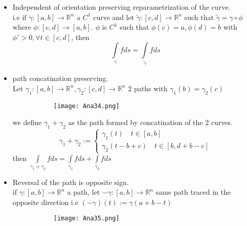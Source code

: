 \documentclass[8pt]{extreport}
\newcommand{\R}{\mathbb{R}}
\begin{document}
\begin{itemize}
\item Independent of orientation preserving reparametrization of the curve.\\
i.e if $\gamma : [a,b] \to \R^n$ a $C^1$ curve and let $\tilde{\gamma} : [c,d] \to \R^n$ such that $\tilde{\gamma} = \gamma \circ \phi$ where $\phi:[c,d] \to [a,b]$. $\phi$ is $C^1$ such that $\phi(c) = a, \phi(d) = b$ with $\phi' > 0, \forall t \in [c,d]$, then 
$$ \int\limits_\gamma fds = \int\limits_{\tilde{\gamma}} fds$$
\item path concatination preserving.\\
Let $\gamma_1 :[a,b] \to \R^n, \gamma_2: [c,d] \to \R^n$ 2 paths with $\gamma_1(b) = \gamma_2(c)$
\begin{figure}[H]
\centering
\begin{subfigure}[b]{0.4\linewidth}
\texttt{[image: Ana34.png]}
\end{subfigure}
\end{figure}
we define $\gamma_1 + \gamma_2$ as the path formed by concatination of the 2 curves.\\
$$ \gamma_1 + \gamma_2 := \begin{cases} \gamma_1(t) \quad t \in [a,b] \\ \gamma_2(t-b+c) \quad t \in [b,d + b-c] \end{cases}$$
then $\int\limits_{\gamma_1 + \gamma_2} f ds = \int\limits_{\gamma_1}fds +\int\limits_{\gamma_2}fds$
\item Reversal of the path is opposite sign.\\
if $\gamma:[a,b] \to \R^n$ a path, let $-\gamma:[a,b] \to \R^n$ same path traced in the opposite direction i.e $(-\gamma)(t) := \gamma (a+b-t)$
\begin{figure}[H]
\centering
\begin{subfigure}[b]{0.4\linewidth}
\texttt{[image: Ana35.png]}
\end{subfigure}
\end{figure}


\end{itemize}
\end{document}
